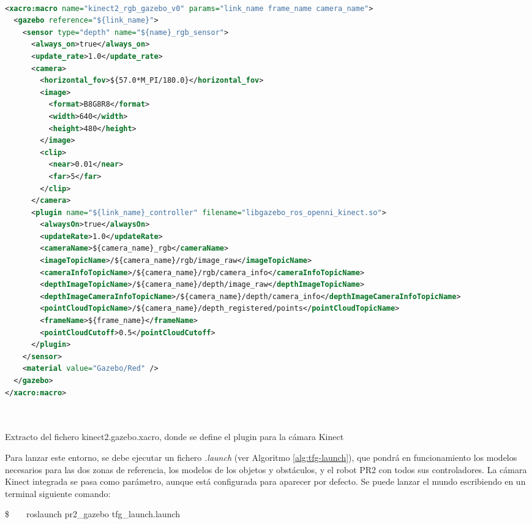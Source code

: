 \documentclass[12pt,spanish,chapterprefix, numbers=noenddot]{book}
\numberwithin{equation}{section}
\numberwithin{figure}{section}
\begin{document}
\begin{algorithm}[htbp!]
	\begin{lstlisting}[breaklines=true,language=xml]    

<xacro:macro name="kinect2_rgb_gazebo_v0" params="link_name frame_name camera_name">
  <gazebo reference="${link_name}">
    <sensor type="depth" name="${name}_rgb_sensor">
      <always_on>true</always_on>
      <update_rate>1.0</update_rate>
      <camera>
        <horizontal_fov>${57.0*M_PI/180.0}</horizontal_fov>
        <image>
          <format>B8G8R8</format>
          <width>640</width>
          <height>480</height>
        </image>
        <clip>
          <near>0.01</near>
          <far>5</far>
        </clip>
      </camera>
      <plugin name="${link_name}_controller" filename="libgazebo_ros_openni_kinect.so">
        <alwaysOn>true</alwaysOn>
        <updateRate>1.0</updateRate>
        <cameraName>${camera_name}_rgb</cameraName>
        <imageTopicName>/${camera_name}/rgb/image_raw</imageTopicName>
        <cameraInfoTopicName>/${camera_name}/rgb/camera_info</cameraInfoTopicName>
        <depthImageTopicName>/${camera_name}/depth/image_raw</depthImageTopicName>
        <depthImageCameraInfoTopicName>/${camera_name}/depth/camera_info</depthImageCameraInfoTopicName>
        <pointCloudTopicName>/${camera_name}/depth_registered/points</pointCloudTopicName>
        <frameName>${frame_name}</frameName>
        <pointCloudCutoff>0.5</pointCloudCutoff>
      </plugin>
    </sensor>
    <material value="Gazebo/Red" />
  </gazebo>
</xacro:macro>
         
         
	\end{lstlisting}
\caption{\label{alg:kinect2-xacro}Extracto del fichero kinect2.gazebo.xacro, donde se define el plugin para la cámara Kinect}
\end{algorithm}

Para lanzar este entorno, se debe ejecutar un fichero \textit{.launch} (ver Algoritmo \ref{alg:tfg-launch}), que pondrá en funcionamiento los modelos necesarios para las dos zonas de referencia, los modelos de los objetos y obstáculos, y el robot PR2 con todos sus controladores. La cámara Kinect integrada se pasa como parámetro, aunque está configurada para aparecer por defecto. Se puede lanzar el mundo escribiendo en un terminal siguiente comando:

\$\ \ \ \ roslaunch pr2\_gazebo tfg\_launch.launch
\end{document}
